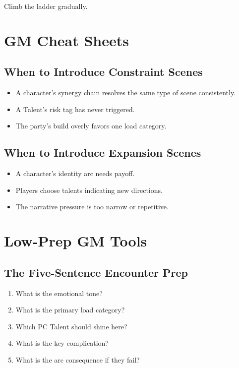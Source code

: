 \documentclass[11pt]{book}
\begin{document}
Climb the ladder gradually.

\section{GM Cheat Sheets}

\subsection{When to Introduce Constraint Scenes}

\begin{itemize}
    \item A character's synergy chain resolves the same type of scene consistently.
    \item A Talent's risk tag has never triggered.
    \item The party's build overly favors one load category.
\end{itemize}

\subsection{When to Introduce Expansion Scenes}

\begin{itemize}
    \item A character's identity arc needs payoff.
    \item Players choose talents indicating new directions.
    \item The narrative pressure is too narrow or repetitive.
\end{itemize}

\section{Low-Prep GM Tools}

\subsection{The Five-Sentence Encounter Prep}

\begin{enumerate}
    \item What is the emotional tone?  
    \item What is the primary load category?  
    \item Which PC Talent should shine here?  
    \item What is the key complication?  
    \item What is the arc consequence if they fail?
\end{enumerate}
\end{document}
